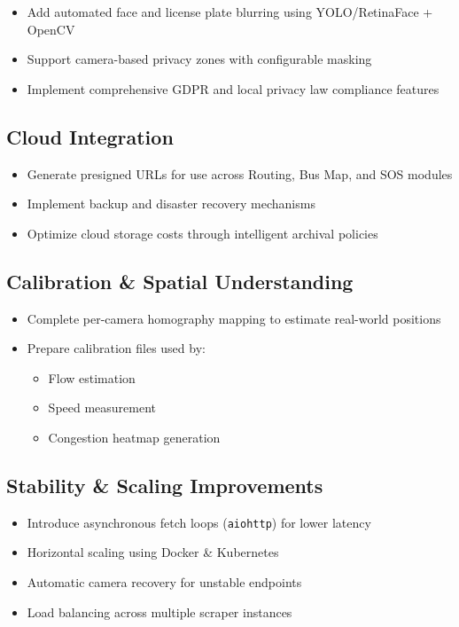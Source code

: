 \begin{itemize}
    \item Add automated face and license plate blurring using YOLO/RetinaFace + OpenCV
    \item Support camera-based privacy zones with configurable masking
    \item Implement comprehensive GDPR and local privacy law compliance features
\end{itemize}

\subsection{Cloud Integration}

\begin{itemize}
    \item Generate presigned URLs for use across Routing, Bus Map, and SOS modules
    \item Implement backup and disaster recovery mechanisms
    \item Optimize cloud storage costs through intelligent archival policies
\end{itemize}

\subsection{Calibration \& Spatial Understanding}

\begin{itemize}
    \item Complete per-camera homography mapping to estimate real-world positions
    \item Prepare calibration files used by:
    \begin{itemize}
        \item Flow estimation
        \item Speed measurement
        \item Congestion heatmap generation
    \end{itemize}
\end{itemize}

\subsection{Stability \& Scaling Improvements}

\begin{itemize}
    \item Introduce asynchronous fetch loops (\texttt{aiohttp}) for lower latency
    \item Horizontal scaling using Docker \& Kubernetes
    \item Automatic camera recovery for unstable endpoints
    \item Load balancing across multiple scraper instances
\end{itemize}

